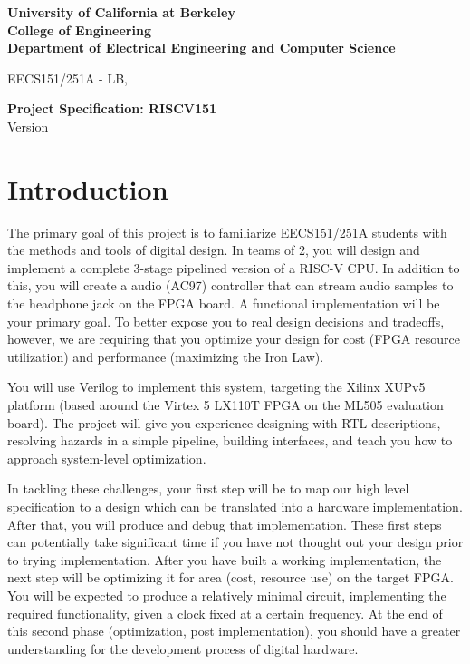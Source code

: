 \documentclass[11pt]{article}
\begin{document}
\begin{center}
{\bf
University of California at Berkeley \\
College of Engineering \\
Department of Electrical Engineering and Computer Science \\
}
\end{center}

\begin{center}
EECS151/251A - LB, \currentSemester
\end{center}

\begin{center}
\LARGE
{\bf Project Specification: RISCV151 }  \\
Version \projectSpecVersion
\end{center}

\tableofcontents

\newpage

\section{Introduction}

The primary goal of this project is to familiarize EECS151/251A students with the methods and tools of digital design.  In teams of 2, you will design and implement a complete 3-stage pipelined version of a RISC-V CPU. In addition to this, you will create a audio (AC97) controller that can stream audio samples to the headphone jack on the FPGA board. A functional implementation will be your primary goal.  To better expose you to real design decisions and tradeoffs, however, we are requiring that you optimize your design for cost (FPGA resource utilization) and performance (maximizing the Iron Law).

You will use Verilog to implement this system, targeting the Xilinx XUPv5 platform (based around the Virtex 5 LX110T FPGA on the ML505 evaluation board). The project will give you experience designing with RTL descriptions, resolving hazards in a simple pipeline, building interfaces, and teach you how to approach system-level optimization.

In tackling these challenges, your first step will be to map our high level specification to a design which can be translated into a hardware implementation.  After that, you will produce and debug that implementation. These first steps can potentially take significant time if you have not thought out your design prior to trying implementation.  After you have built a working implementation, the next step will be optimizing it for area (cost, resource use) on the target FPGA.  You will be expected to produce a relatively minimal circuit, implementing the required functionality, given a clock fixed at a certain frequency.  At the end of this second phase (optimization, post implementation), you should have a greater understanding for the development process of digital hardware.
\end{document}
